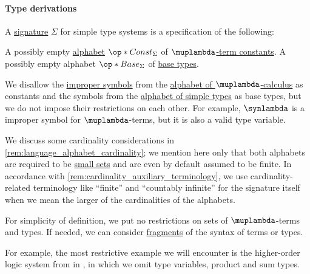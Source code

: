 \paragraph{Type derivations}

\begin{definition}\label{def:simple_type_signature}\mimprovised
  A \hyperref[con:logical_system_signature]{signature} \( \Sigma \) for simple type systems is a specification of the following:
  \begin{thmenum}
     A possibly empty \hyperref[def:formal_language/alphabet]{alphabet} \( \op*{Const}_\Sigma \) of \hyperref[def:lambda_term]{\( \muplambda \)-term constants}.
     A possibly empty alphabet \( \op*{Base}_\Sigma \) of \hyperref[def:simple_type]{base types}.
  \end{thmenum}

  We disallow the \hyperref[con:improper_symbol]{improper symbols} from the \hyperref[def:lambda_term_alphabet]{alphabet of \( \muplambda \)-calculus} as constants and the symbols from the \hyperref[def:simple_type_alphabet]{alphabet of simple types} as base types, but we do not impose their restrictions on each other. For example, \( \synlambda \) is a improper symbol for \( \muplambda \)-terms, but it is also a valid type variable.

  \item We discuss some cardinality considerations in \cref{rem:language_alphabet_cardinality}; we mention here only that both alphabets are required to be \hyperref[def:small_set]{small sets} and are even by default assumed to be finite. In accordance with \cref{rem:cardinality_auxiliary_terminology}, we use cardinality-related terminology like \enquote{finite} and \enquote{countably infinite} for the signature itself when we mean the larger of the cardinalities of the alphabets.
  \end{definition}
\begin{comments}
  \item For simplicity of definition, we put no restrictions on sets of \( \muplambda \)-terms and types. If needed, we can consider \hyperref[con:syntax_fragment]{fragments} of the syntax of terms or types.

  For example, the most restrictive example we will encounter is the higher-order logic system from in , in which we omit type variables, product and sum types.
\end{comments}

